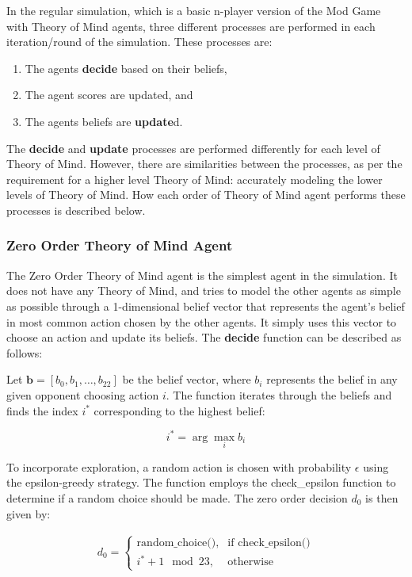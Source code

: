 In the regular simulation, which is a basic n-player version of the Mod Game with Theory of Mind agents, three different processes are performed in each iteration/round of the simulation. These processes are:
\begin{enumerate}
    \item The agents \textbf{decide} based on their beliefs,
    \item The agent scores are updated, and
    \item The agents beliefs are \textbf{update}d.
\end{enumerate}

The \textbf{decide} and \textbf{update} processes are performed differently for each level of Theory of Mind. However, there are similarities between the processes, as per the requirement for a higher level Theory of Mind: accurately modeling the lower levels of Theory of Mind. How each order of Theory of Mind agent performs these processes is described below.

\subsubsection{Zero Order Theory of Mind Agent}

The Zero Order Theory of Mind agent is the simplest agent in the simulation. It does not have any Theory of Mind, and tries to model the other agents as simple as possible through a 1-dimensional belief vector that represents the agent's belief in most common action chosen by the other agents. It simply uses this vector to choose an action and update its beliefs. The \textbf{decide} function can be described as follows:

Let $\mathbf{b} = [b_0, b_1, \ldots, b_{22}]$ be the belief vector, where $b_i$ represents the belief in any given opponent choosing action $i$. The function iterates through the beliefs and finds the index $i^*$ corresponding to the highest belief:

\[
i^* = \arg\max_i b_i
\]

To incorporate exploration, a random action is chosen with probability $\epsilon$ using the epsilon-greedy strategy. The function employs the check\_epsilon function to determine if a random choice should be made. The zero order decision $d_0$ is then given by:

\label{eq:zero-order-decide}
\[
\begin{aligned}
d_0 =
\begin{cases}
\text{{random\_choice()}}, & \text{{if }} \text{{check\_epsilon()}} \\
i^* + 1 \mod 23, & \text{{otherwise}}
\end{cases}
\end{aligned}
\]

